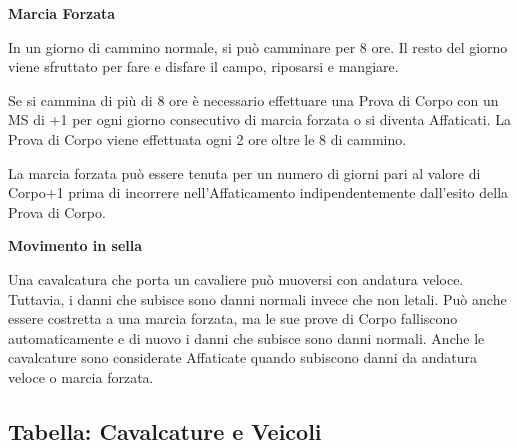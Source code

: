 \documentclass[12pt,a4paper,twoside,openany]{book}
\begin{document}
\begin{multicols}{2}
\begin{flushleft}
\end{flushleft}
\bigskip

\textbf{Marcia Forzata}\label{marciaforzata}

In un giorno di cammino normale, si può camminare per 8 ore. Il resto del giorno viene sfruttato per fare e disfare il campo, riposarsi e mangiare.

Se si cammina di più di 8 ore è necessario effettuare una Prova di Corpo con un MS di +1 per ogni giorno consecutivo di marcia forzata o si diventa Affaticati. La Prova di Corpo viene effettuata ogni 2 ore oltre le 8 di cammino.

La marcia forzata può essere tenuta per un numero di giorni pari al valore di Corpo+1 prima di incorrere nell'Affaticamento indipendentemente dall'esito della Prova di Corpo.


\textbf{Movimento in sella}\label{movimentoacavallo}

Una cavalcatura che porta un cavaliere può muoversi con andatura veloce. Tuttavia, i danni che subisce sono danni normali invece che non letali. Può anche essere costretta a una marcia forzata, ma le sue prove di Corpo falliscono automaticamente e di nuovo i danni che subisce sono danni normali. Anche le cavalcature sono considerate Affaticate quando subiscono danni da andatura veloce o marcia forzata.

\end{multicols}


\subsection{Tabella: Cavalcature e Veicoli}

\medskip

\label{tabella-cavalcature-e-veicoli}
\end{document}
